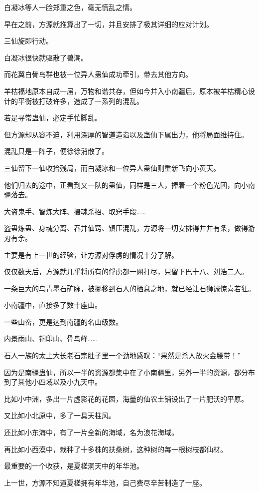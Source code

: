 \begin{this_body}
白凝冰等人一脸郑重之色，毫无慌乱之情。

早在之前，方源就推算出了一切，并且安排了极其详细的应对计划。

三仙旋即行动。

白凝冰很快就驱散了兽潮。

而花翼白骨鸟群也被一位异人蛊仙成功牵引，带去其他方向。

羊枯福地原本自成一届，万物和谐共存，但如今并入小南疆后，原本被羊枯精心设计的平衡被打破许多，造成了一系列的混乱。

若是寻常蛊仙，必定手忙脚乱。

但方源却从容不迫，利用深厚的智道造诣以及蛊仙下属出力，他将局面维持住。

混乱只是一阵子，便徐徐消散了。

三仙留下一仙收拾残局，而白凝冰和一位异人蛊仙则重新飞向小黄天。

他们归去的途中，正看到又一队的蛊仙，同样是三人，捧着一个粉色光团，向小南疆落去。

大盗鬼手、智炼大阵、摄魂杀招、取窍手段……

盗蛊炼蛊、身魂分离、吞并仙窍、镇压混乱，方源将一切安排得井井有条，做得游刃有余。

主要是有上一世的经验，让方源对俘虏的情况十分了解。

仅仅数天后，方源就几乎将所有的俘虏都一网打尽，只留下巴十八、刘浩二人。

一条巨大的乌青墨石矿脉，被挪移到石人的栖息之地，就已经让石狮诚惊喜若狂。

小南疆中，直接多了数十座山。

一些山峦，更是达到南疆的名山级数。

内景雨山、铜印山、骨鸟峰……

石人一族的太上大长老石宗肚子里一个劲地感叹：“果然是杀人放火金腰带！”

因为是南疆蛊仙，所以一半的资源都集中在了小南疆里，另外一半的资源，都分布到了其他小四域以及小九天中。

比如小中洲，多出一片虚影花的花园，海量的仙农土铺设出了一片肥沃的平原。

又比如小北原中，多了一具天柱风。

还比如小东海中，有了一片全新的海域，名为浪花海域。

再比如小西漠中，栽种了十多株的扶桑树，这种树的每一根树枝都仙材。

最重要的一个收获，是夏槎洞天中的年华池。

上一世，方源不知道夏槎拥有年华池，自己费尽辛苦制造了一座。


\end{this_body}
